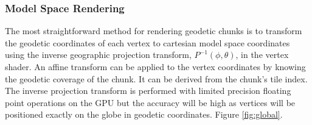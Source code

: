 \subsubsection{Model Space Rendering}

The most straightforward method for rendering geodetic chunks is to transform the geodetic coordinates of each vertex to cartesian model space coordinates using the inverse geographic projection transform, $P^{-1}(\phi, \theta)$, in the vertex shader. An affine transform can be applied to the vertex coordinates by knowing the geodetic coverage of the chunk. It can be derived from the chunk's tile index. The inverse projection transform is performed with limited precision floating point operations on the GPU but the accuracy will be high as vertices will be positioned exactly on the globe in geodetic coordinates. Figure \ref{fig:global}.

